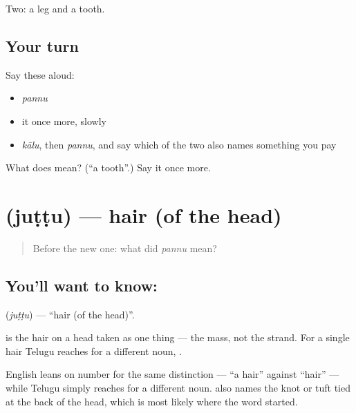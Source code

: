 \begin{grammarlens}[title={What you've built}]
Two: a leg and a tooth.
\end{grammarlens}

\subsection*{Your turn}
Say these aloud:

\begin{itemize}
\raggedright
  \item \emph{pannu}
  \item it once more, slowly
  \item \emph{kālu}, then \emph{pannu}, and say which of the two also names something you pay
\end{itemize}

\begin{tcolorbox}[breakable,colback=teal!4,colframe=teal!35!black,title={Before you move on}]
What does  mean? (\textquotedblleft{}a tooth\textquotedblright{}.) Say it once more.
\end{tcolorbox}
\section[\texorpdfstring{\te{జుట్టు} (juṭṭu)}{జుట్టు (juṭṭu)}]{ (juṭṭu) — hair (of the head)}

\label{lesson:TE-C47-hair}



\begin{quote}
Before the new one: what did \emph{pannu} mean?
\end{quote}

\subsection*{You'll want to know: }
\textbf{} (\emph{juṭṭu}) — \textquotedblleft{}hair (of the head)\textquotedblright{}.

 is the hair on a head taken as one thing — the mass, not the strand. For a single hair Telugu reaches for a different noun, .

English leans on number for the same distinction --- \textquotedblleft{}a hair\textquotedblright{} against \textquotedblleft{}hair\textquotedblright{} --- while Telugu simply reaches for a different noun.  also names the knot or tuft tied at the back of the head, which is most likely where the word started.

